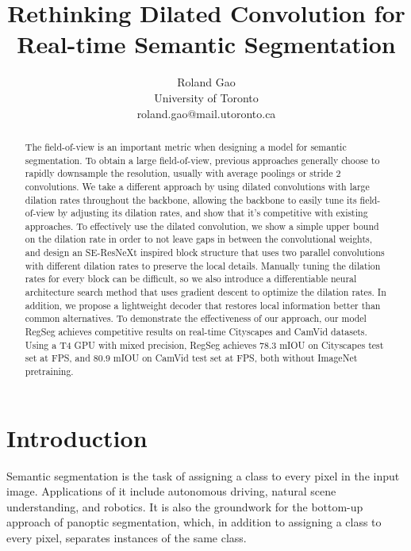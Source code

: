 \documentclass[10pt,twocolumn,letterpaper]{article}
\begin{document}
\title{Rethinking Dilated Convolution for Real-time Semantic Segmentation}

\author{Roland Gao\\
University of Toronto\\
roland.gao@mail.utoronto.ca\\
}
\maketitle

\begin{abstract}
The field-of-view is an important metric when designing a model for semantic segmentation. To obtain a large field-of-view, previous approaches generally choose to rapidly downsample the resolution, usually with average poolings or stride 2 convolutions. We take a different approach by using dilated convolutions with large dilation rates throughout the backbone, allowing the backbone to easily tune its field-of-view by adjusting its dilation rates, and show that it's competitive with existing approaches. To effectively use the dilated convolution, we show a simple upper bound on the dilation rate in order to not leave gaps in between the convolutional weights, and design an SE-ResNeXt inspired block structure that uses two parallel  convolutions with different dilation rates to preserve the local details. Manually tuning the dilation rates for every block can be difficult, so we also introduce a differentiable neural architecture search method that uses gradient descent to optimize the dilation rates. In addition, we propose a lightweight decoder that restores local information better than common alternatives. To demonstrate the effectiveness of our approach, our model RegSeg achieves competitive results on real-time Cityscapes and CamVid datasets. Using a T4 GPU with mixed precision, RegSeg achieves 78.3 mIOU on Cityscapes test set at  FPS, and 80.9 mIOU on CamVid test set at  FPS, both without ImageNet pretraining.
\end{abstract}


\section{Introduction}
\label{sec:intro}

Semantic segmentation is the task of assigning a class to every pixel in the input image. Applications of it include autonomous driving, natural scene understanding, and robotics. It is also the groundwork for the bottom-up approach\cite{panoptic_deeplab_2020} of panoptic segmentation, which, in addition to assigning a class to every pixel, separates instances of the same class.
\end{document}
